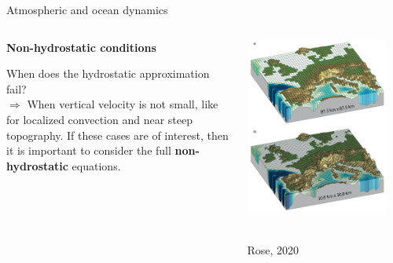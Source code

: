 \documentclass[aspectratio=169,xcolor=dvipsnames]{beamer}
\newcommand\credit[2]{
        \\ \vspace{-0.5em}
        {\color{gray}\scriptsize
        \hfill
        #1
        \hspace{#2}}
        }
\begin{document}
\begin{frame}[t]{Atmospheric and ocean dynamics}

\vspace{-1.0em}

\begin{columns}
    \begin{column}[t]{0.6\textwidth}
        \begin{center}
        \textbf{{\large
        Non-hydrostatic conditions
        }}
        \end{center}
        
        \vspace{1.5em}
        
        When does the hydrostatic approximation fail?
        \\[1em]
        $\Longrightarrow$ When vertical velocity is not small, like for localized convection and near steep topography. 
        \newline
        \newline
        If these cases are of interest, then it is important to consider the full \textbf{non-hydrostatic} equations.
    \end{column}
    \begin{column}[t]{0.4\textwidth}
        \centering
        
        \includegraphics[width=0.9\textwidth]{figs/Fig-gcm-resolution-Fig1-14.jpg}
        \credit{Rose, 2020}{5pt}
    \end{column}
\end{columns}
        
\end{frame}
\end{document}
